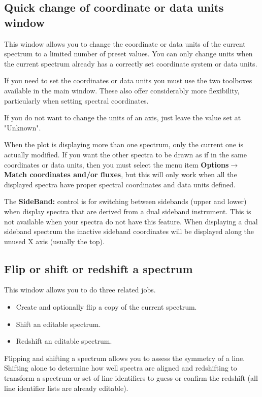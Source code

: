 \documentclass[twoside,11pt]{article}
\newcommand{\latexhtml}[2]{#1}
\renewcommand{\_}{\texttt{\symbol{95}}}
\newcommand{\submenuitem}[2]{\latexhtml{\textbf{#1$\rightarrow$#2}}{\textbf{#1->#2}}}
\newcommand{\labelitem}[1]{\textbf{#1}}
\begin{document}
\newpage
\subsection{Quick change of coordinate or data units window}

This window allows you to change the coordinate or data units of the current
spectrum to a limited number of preset values. You can only change units when
the current spectrum already has a correctly set coordinate system or data
units.

If you need to set the coordinates or data units you must use the two
toolboxes available in the main window. These also offer considerably more
flexibility, particularly when setting spectral coordinates.

If you do not want to change the units of an axis, just leave the value set at
"Unknown".

When the plot is displaying more than one spectrum, only the current one is
actually modified. If you want the other spectra to be drawn as if in the same
coordinates or data units, then you must select the menu item
\submenuitem{Options}{Match coordinates and/or fluxes}, but this will only
work when all the displayed spectra have proper spectral coordinates and data
units defined.

The \labelitem{SideBand:} control is for switching between sidebands (upper
and lower) when display spectra that are derived from a dual sideband
instrument. This is not available when your spectra do not have this feature.
When displaying a dual sideband spectrum the inactive sideband coordinates
will be displayed along the unused X axis (usually the top).

\newpage
\subsection{Flip or shift or redshift a spectrum}

This window allows you to do three related jobs.
\begin{itemize}
\item Create and optionally flip a copy of the current spectrum.
\item Shift an editable spectrum.
\item Redshift an editable spectrum.
\end{itemize}

Flipping and shifting a spectrum allows you to assess the symmetry of a
line. Shifting alone to determine how well spectra are aligned and redshifting
to transform a spectrum or set of line identifiers to guess or confirm the
redshift (all line identifier lists are already editable).
\end{document}
